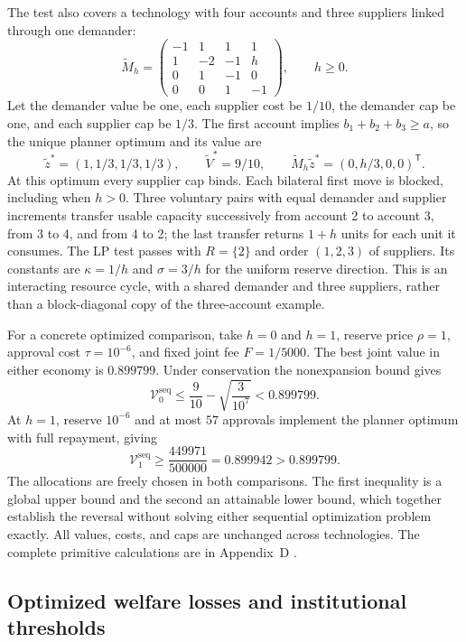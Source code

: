 \documentclass[ecta,draft]{econsocart}
\theoremstyle{definition}
\theoremstyle{definition}
\begin{document}
The test also covers a technology with four accounts and three
suppliers linked through one demander:
\[
 \widetilde M_h=
 \begin{pmatrix}
 -1&1&1&1\\
 1&-2&-1&h\\
 0&1&-1&0\\
 0&0&1&-1
 \end{pmatrix},\qquad h\geq0.
\]
Let the demander value be one, each supplier cost be $1/10$, the
demander cap be one, and each supplier cap be $1/3$. The first
account implies $b_1+b_2+b_3\geq a$, so the unique planner optimum
and its value are
\[
 \widetilde z^*=(1,1/3,1/3,1/3),\qquad
 \widetilde V^*=9/10,
 \qquad
 \widetilde M_h\widetilde z^*=(0,h/3,0,0)^{\mathsf T}.
\]
At this optimum every supplier cap binds. Each bilateral first move
is blocked, including when $h>0$. Three voluntary pairs with equal
demander and supplier increments transfer usable capacity successively
from account 2 to account 3, from 3 to 4, and from 4 to 2; the last
transfer returns $1+h$ units for each unit it consumes. The LP test
passes with $R=\{2\}$ and order $(1,2,3)$ of suppliers. Its
constants are $\kappa=1/h$ and $\sigma=3/h$ for the uniform
reserve direction. This is an interacting resource cycle, with a
shared demander and three suppliers, rather than a block-diagonal
copy of the three-account example.

For a concrete optimized comparison, take $h=0$ and $h=1$, reserve
price $\rho=1$, approval cost $\tau=10^{-6}$, and fixed joint fee
$F=1/5000$. The best joint value in either economy is $0.899799$.
Under conservation the nonexpansion bound gives
\[
 \mathcal V_0^{\mathrm{seq}}
 \leq\frac9{10}-\sqrt{\frac3{10^7}}
 <0.899799.
\]
At $h=1$, reserve $10^{-6}$ and at most $57$ approvals implement the
planner optimum with full repayment, giving
\[
 \mathcal V_1^{\mathrm{seq}}
 \geq\frac{449971}{500000}=0.899942>0.899799.
\]
The allocations are freely chosen in both comparisons. The first
inequality is a global upper bound and the second an attainable lower
bound, which together establish the reversal without solving either
sequential optimization problem exactly. All values, costs, and caps
are unchanged across technologies. The complete primitive calculations
are in Appendix~D%
.

\subsection{Optimized welfare losses and institutional thresholds}
\label{sec:optimizedloss}
\end{document}

